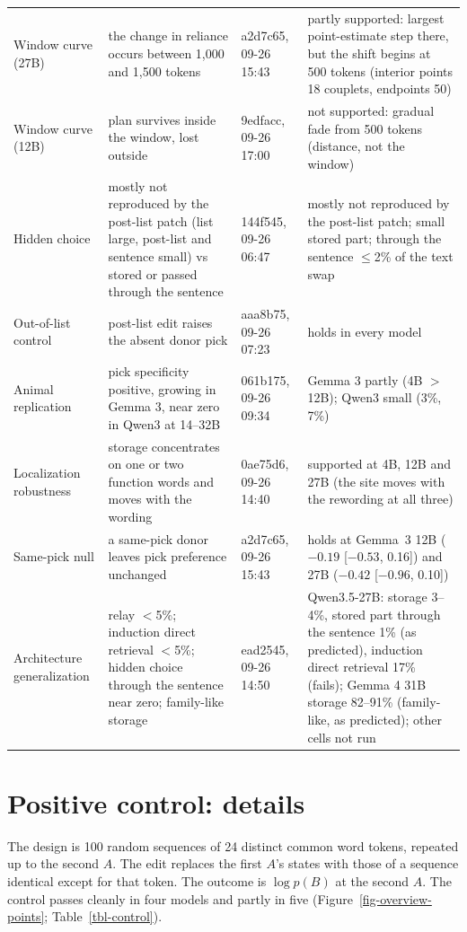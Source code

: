\documentclass[
]{article}
\begin{document}
\begin{table}
{\begin{tabular}{@{}>{\raggedright\arraybackslash}p{2.5cm}>{\raggedright\arraybackslash}p{4.6cm}>{\raggedright\arraybackslash}p{1.9cm}>{\raggedright\arraybackslash}p{4.7cm}@{}}
Window curve (27B) & the change in reliance occurs between 1,000 and 1,500 tokens & a2d7c65, 09-26 15:43 & partly supported: largest point-estimate step there, but the shift begins at 500 tokens (interior points 18 couplets, endpoints 50)\\
Window curve (12B) & plan survives inside the window, lost outside & 9edfacc, 09-26 17:00 & not supported: gradual fade from 500 tokens (distance, not the window)\\
Hidden choice & mostly not reproduced by the post-list patch (list large, post-list and sentence small) vs stored or passed through the sentence & 144f545, 09-26 06:47 & mostly not reproduced by the post-list patch; small stored part; through the sentence $\le$2\% of the text swap\\
Out-of-list control & post-list edit raises the absent donor pick & aaa8b75, 09-26 07:23 & holds in every model\\
Animal replication & pick specificity positive, growing in Gemma 3, near zero in Qwen3 at 14--32B & 061b175, 09-26 09:34 & Gemma 3 partly (4B $>$ 12B); Qwen3 small (3\%, 7\%)\\
Localization robustness & storage concentrates on one or two function words and moves with the wording & 0ae75d6, 09-26 14:40 & supported at 4B, 12B and 27B (the site moves with the rewording at all three)\\
Same-pick null & a same-pick donor leaves pick preference unchanged & a2d7c65, 09-26 15:43 & holds at Gemma~3 12B ($-0.19$ [$-0.53$, 0.16]) and 27B ($-0.42$ [$-0.96$, 0.10])\\
Architecture generalization & relay $<$5\%; induction direct retrieval $<$5\%; hidden choice through the sentence near zero; family-like storage & ead2545, 09-26 14:50 & Qwen3.5-27B: storage 3--4\%, stored part through the sentence 1\% (as predicted), induction direct retrieval 17\% (fails); Gemma 4 31B storage 82--91\% (family-like, as predicted); other cells not run\\
\bottomrule
\end{tabular}

}

\end{table}%

\section{Positive control: details}\label{sec-app-control}

The design is 100 random sequences of 24 distinct common word tokens,
repeated up to the second \(A\). The edit replaces the first \(A\)'s
states with those of a sequence identical except for that token. The
outcome is \(\log p(B)\) at the second \(A\). The control passes cleanly
in four models and partly in five (Figure~\ref{fig-overview-points};
Table~\ref{tbl-control}).
\end{document}
